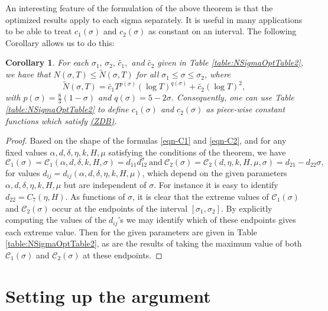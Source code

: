 \documentclass[10pt]{amsart}
\newcommand{\s}{\sigma}
\newtheorem{cor}[prop]{Corollary}
\theoremstyle{definition}
\numberwithin{equation}{section}
\begin{document}
An interesting feature of the formulation of the above theorem is that the optimized results apply to each sigma separately. 
It is useful in many applications to be able to treat $c_1(\s)$ and $c_2(\s)$  as constant on an interval.
The following Corollary allows us to do this:
\begin{cor}\label{ZDinterval}
For each $\s_1,\, \s_2,\, \tilde{c_1},$ and $\tilde{c_2}$ given in Table \ref{table:NSigmaOptTable2}, we have that
$N(\s,T)\le \tilde N(\s,T)$ for all $\s_1 \le  \s \le  \s_2$,
where
\begin{equation}\label{ZD} 
\tilde N(\s,T) =  \tilde{c_1} T^{p(\sigma)} (\log T )^{q(\sigma)}+ \tilde{c_2} (\log T)^2,
\end{equation}
 with $p(\s) = \frac{8}{3}(1-\s)$ and $q(\s) = 5-2\s$.
Consequently, one can use Table \ref{table:NSigmaOptTable2} to define $c_1(\s)$ and $c_2(\s)$ as piece-wise constant functions which satisfy \hyperref[ZDB]{(ZDB)}.


\end{cor}
%
\begin{proof}
Based on the shape of the formulas \eqref{eqn-C1} and \eqref{eqn-C2}, 
and for any fixed values $\alpha , d, \delta, \eta, k,H, \mu$ satisfying the conditions of the theorem, 
we have 
\[   \mathcal{C}_1(\sigma) =  \mathcal{C}_1(\alpha, d,\delta, k, H, \s) =   d_{11} d_{12}^\sigma 
\ \text{and}\ 
\mathcal{C}_2(\sigma) = \mathcal{C}_2 (d, \eta, k, H, \mu,\s) = d_{21} - d_{22} \sigma, \]
for values $ d_{ij}=d_{ij}(\alpha , d, \delta, \eta, k,H, \mu)$, which depend on the given parameters $\alpha , d, \delta, \eta, k,H, \mu$ but are independent of $\s$. For instance it is easy to identify $d_{22}=C_7(\eta, H)$. 
As functions of $\sigma$, it is clear that the extreme values of $ \mathcal{C}_1(\sigma)$ and $ \mathcal{C}_2(\sigma)$ occur at the endpoints of the interval $[\sigma_1,\sigma_2]$. 
By explicitly computing the values of the $d_{ij}$'s we may identify which of these endpoints gives each extreme value.
Then for the given parameters are given in Table \ref{table:NSigmaOptTable2}, 
as are the results of taking the maximum value of both $ \mathcal{C}_1(\sigma)$ and $ \mathcal{C}_2(\sigma)$ at these endpoints.
\end{proof}


\section{Setting up the argument}
\end{document}
